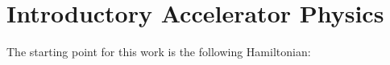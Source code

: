 \chapter{Introductory Accelerator Physics}
The starting point for this work is the following Hamiltonian: